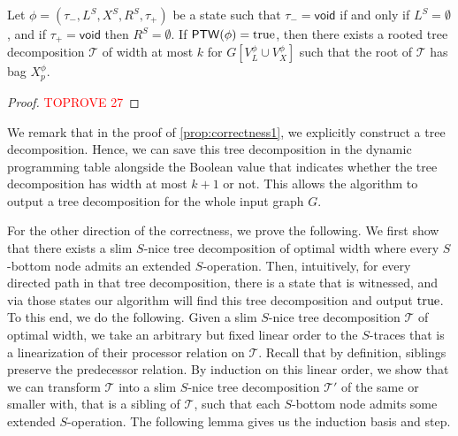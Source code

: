 \documentclass[a4paper,UKenglish,cleveref, autoref, thm-restate, numberwithinsect]{lipics-v2021}
\newcounter{algorithm}
\newcommand{\void}{\mathsf{void}}
\newcommand{\ptw}{\mathsf{PTW}}
\newcommand{\true}{\textup{true}}
\begin{document}
\begin{proposition}\label{prop:correctness1}
Let $\phi=(\tau_-,L^S, X^S, R^S,\tau_+)$ be a state such that $\tau_-=\void$ if and only if $L^S=\emptyset$, and if $\tau_+=\void$ then $R^S=\emptyset$.
If $\ptw(\phi)=\true$, then there exists a rooted tree decomposition $\mathcal{T}$ of width at most $k$ for $G[V^\phi_L\cup V^\phi_X]$ such that the root of $\mathcal{T}$ has bag $X^\phi_p$. 
\end{proposition}
\begin{proof}\textcolor{red}{TOPROVE 27}\end{proof}

We remark that in the proof of \cref{prop:correctness1}, we explicitly construct a tree decomposition. Hence, we can save this tree decomposition in the dynamic programming table alongside the Boolean value that indicates whether the tree decomposition has width at most $k+1$ or not. This allows the algorithm to output a tree decomposition for the whole input graph $G$.


For the other direction of the correctness, we prove the following. We first show that there exists a slim $S$-nice tree decomposition of optimal width where every $S$-bottom node admits an extended $S$-operation. Then, intuitively, for every directed path in that tree decomposition, there is a state that is witnessed, and via those states our algorithm will find this tree decomposition and output $\true$. 
To this end, we do the following. Given a slim $S$-nice tree decomposition $\mathcal{T}$ of optimal width, we take an arbitrary but fixed linear order to the $S$-traces that is a linearization of their processor relation on $\mathcal{T}$. Recall that by definition, siblings preserve the predecessor relation.
By induction on this linear order, we show that we can transform $\mathcal{T}$ into a slim $S$-nice tree decomposition $\mathcal{T}'$ of the same or smaller with, that is a sibling of $\mathcal{T}$, such that each $S$-bottom node admits some extended $S$-operation.
The following lemma gives us the induction basis and step.











    
\end{document}
